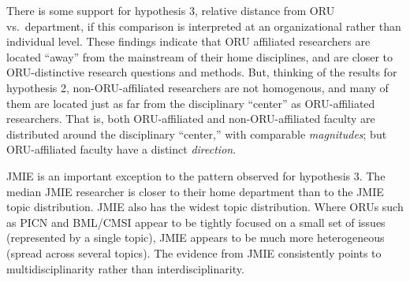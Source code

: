 \documentclass[
  11pt,
]{article}
\begin{document}
There is some support for hypothesis 3, relative distance from ORU vs.~department, if this comparison is interpreted at an organizational rather than individual level. These findings indicate that ORU affiliated researchers are located ``away'' from the mainstream of their home disciplines, and are closer to ORU-distinctive research questions and methods. But, thinking of the results for hypothesis 2, non-ORU-affiliated researchers are not homogenous, and many of them are located just as far from the disciplinary ``center'' as ORU-affiliated researchers. That is, both ORU-affiliated and non-ORU-affiliated faculty are distributed around the disciplinary ``center,'' with comparable \emph{magnitudes}; but ORU-affiliated faculty have a distinct \emph{direction}.

JMIE is an important exception to the pattern observed for hypothesis 3. The median JMIE researcher is closer to their home department than to the JMIE topic distribution. JMIE also has the widest topic distribution. Where ORUs such as PICN and BML/CMSI appear to be tightly focused on a small set of issues (represented by a single topic), JMIE appears to be much more heterogeneous (spread across several topics). The evidence from JMIE consistently points to multidisciplinarity rather than interdisciplinarity.
\end{document}
